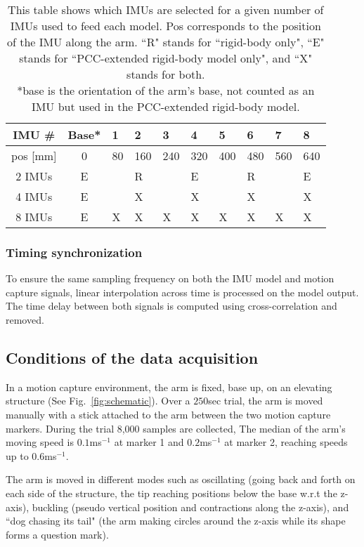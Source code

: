 \begin{table}[ht]
    \centering
    \begin{tabular}{|c|c|m{9pt}|m{9pt}|m{9pt}|m{9pt}|m{9pt}|m{9pt}|m{9pt}|m{9pt}|}
        \hline
        IMU \# & Base* & 1 & 2 & 3 & 4 & 5 & 6 & 7 & 8  \\
        \hline
        \hline
        pos [mm] & 0 & 80 & 160 & 240 & 320 & 400 & 480 & 560 & 640 \\
        \hline
        2 IMUs & E &  & R &  & E &  & R &  & E \\
        \hline
        4 IMUs & E &  & X &  & X &  & X &  & X \\
         \hline
        8 IMUs & E & X  & X & X & X & X & X & X & X \\
        \hline       
    \end{tabular}
    \caption{This table shows which IMUs are selected for a given number of IMUs used to feed each model. Pos corresponds to the position of the IMU along the arm. ``R" stands for ``rigid-body only", ``E" stands for ``PCC-extended rigid-body model only", and ``X" stands for both. \\ *base is the orientation of the arm's base, not counted as an IMU but used in the PCC-extended rigid-body model.}
    \label{tab:which IMUs}
\end{table}

\subsubsection{Timing synchronization} To ensure the same sampling frequency on both the IMU model and motion capture signals, linear interpolation across time is processed on the model output. The time delay between both signals is computed using cross-correlation and removed. 

\subsection{Conditions of the data acquisition}

In a motion capture environment, the arm is fixed, base up, on an elevating structure (See Fig.~\ref{fig:schematic}).
Over a $250$sec trial, the arm is moved manually with a stick attached to the arm between the two motion capture markers. During the trial 8,000 samples are collected, 
The median of the arm's moving speed is $0.1$ms$^{-1}$ at marker 1 and $0.2$ms$^{-1}$ at marker 2, reaching speeds up to $0.6$ms$^{-1}$.


The arm is moved in different modes such as oscillating (going back and forth on each side of the structure, the tip reaching positions below the base w.r.t the z-axis), buckling (pseudo vertical position and contractions along the z-axis), and ``dog chasing its tail" (the arm making circles around the z-axis while its shape forms a question mark).

